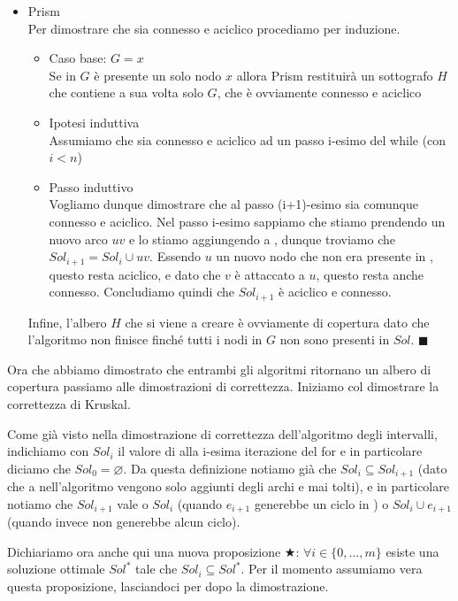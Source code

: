 \documentclass[11pt, a4paper, titlepage, oneside]{scrbook}
\begin{document}
\begin{itemize}
    \item Prism \\
    Per dimostrare che  sia connesso e aciclico procediamo per induzione. 
    \begin{itemize}
        \item Caso base: $G = {x}$ \\
        Se in $G$ è presente un solo nodo $x$ allora Prism restituirà un sottografo $H$ che contiene a sua volta solo $G$, che è ovviamente connesso e aciclico 
        \item Ipotesi induttiva \\
        Assumiamo che  sia connesso e aciclico ad un passo i-esimo del while (con $i < n$)
        \item Passo induttivo \\
        Vogliamo dunque dimostrare che al passo (i+1)-esimo  sia comunque connesso e aciclico. Nel passo i-esimo sappiamo che stiamo prendendo un nuovo arco $uv$ e lo stiamo aggiungendo a , dunque troviamo che $Sol_{i+1} = Sol_i \cup uv$. Essendo $u$ un nuovo nodo che non era presente in , questo resta aciclico, e dato che $v$ è attaccato a $u$, questo resta anche connesso. Concludiamo quindi che $Sol_{i+1}$ è aciclico e connesso. 
    \end{itemize}
    Infine, l'albero $H$ che si viene a creare è ovviamente di copertura dato che l'algoritmo non finisce finché tutti i nodi in $G$ non sono presenti in $Sol$. $\blacksquare$ 
\end{itemize}

Ora che abbiamo dimostrato che entrambi gli algoritmi ritornano un albero di copertura passiamo alle dimostrazioni di correttezza. Iniziamo col dimostrare la correttezza di Kruskal.

\Dimostrazione \nopagebreak

Come già visto nella dimostrazione di correttezza dell'algoritmo degli intervalli, indichiamo con $Sol_i$ il valore di  alla i-esima iterazione del for e in particolare diciamo che $Sol_0 = \varnothing$. Da questa definizione notiamo già che $Sol_i \subseteq Sol_{i+1}$ (dato che a  nell'algoritmo vengono solo aggiunti degli archi e mai tolti), e in particolare notiamo che $Sol_{i+1}$ vale o $Sol_i$ (quando $e_{i+1}$ generebbe un ciclo in ) o $Sol_i \cup e_{i+1}$ (quando invece non generebbe alcun ciclo). 

Dichiariamo ora anche qui una nuova proposizione $\bigstar$: $\forall i \in \{0, \ldots, m\}$ esiste una soluzione ottimale $Sol^*$ tale che $Sol_i \subseteq Sol^*$. Per il momento assumiamo vera questa proposizione, lasciandoci per dopo la dimostrazione.
\end{document}

